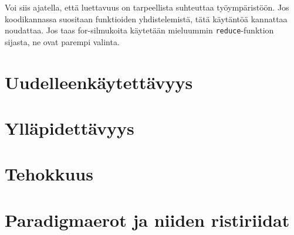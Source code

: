 Voi siis ajatella, että luettavuus on tarpeellista suhteuttaa työympäristöön. Jos koodikannassa suositaan funktioiden yhdistelemistä, tätä käytäntöä kannattaa noudattaa. Jos taas for-silmukoita käytetään mieluummin \texttt{reduce}-funktion sijasta, ne ovat parempi valinta.

\section{Uudelleenkäytettävyys}


\section{Ylläpidettävyys}


\section{Tehokkuus}


\section{Paradigmaerot ja niiden ristiriidat}